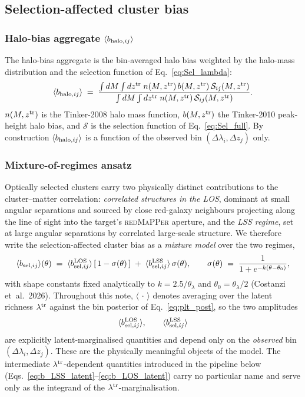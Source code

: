 \documentclass[a4paper, 11pt]{article}
\newcommand{\ltr}{\lambda^{\rm tr}}
\newcommand{\ztr}{z^{\rm tr}}
\newcommand{\bbselij}{\avg{b_{{\rm sel},ij}}}
\newcommand{\bbLOSij}{\avg{b_{{\rm sel},ij}^{\rm LOS}}}
\newcommand{\bbLSSij}{\avg{b_{{\rm sel},ij}^{\rm LSS}}}
\newcommand{\bbhaloij}{\avg{b_{{\rm halo},ij}}}
\newcommand{\avg}[1]{\langle #1 \rangle}
\begin{document}
\subsection{Selection-affected cluster bias}
\label{sec:bias}

\subsubsection{Halo-bias aggregate \texorpdfstring{$\bbhaloij$}{bhalo\_ij}}

The halo-bias aggregate is the bin-averaged halo bias weighted by the
halo-mass distribution and the selection function of
Eq.~\eqref{eq:Sel_lambda}:
\begin{equation}
\bbhaloij
 \;=\; \frac{\int dM \int d\ztr\;n(M,\ztr)\,b(M,\ztr)\,
             \mathcal{S}_{ij}(M,\ztr)}
            {\int dM \int d\ztr\;n(M,\ztr)\,
             \mathcal{S}_{ij}(M,\ztr)} .
\label{eq:bhalo}
\end{equation}
$n(M,\ztr)$ is the Tinker-2008 halo mass function, $b(M,\ztr)$ the
Tinker-2010 peak-height halo bias, and $\mathcal{S}$ is the
selection function of Eq.~\eqref{eq:Sel_full}.  By construction
$\bbhaloij$ is a function of the observed bin
$(\Delta\lambda_i,\Delta z_j)$ only.

\subsubsection{Mixture-of-regimes ansatz}

Optically selected clusters carry two physically distinct
contributions to the cluster--matter correlation: \emph{correlated
structures in the LOS}, dominant at small angular separations and
sourced by close red-galaxy neighbours projecting along the line of
sight into the target's \textsc{redMaPPer} aperture, and the
\emph{LSS regime}, set at large angular separations by correlated
large-scale structure.  We therefore write the
selection-affected cluster bias as a \emph{mixture model} over the
two regimes,
\begin{equation}
\bbselij(\theta) \;=\;
\bbLOSij\,[\,1-\sigma(\theta)\,]
\;+\;
\bbLSSij\,\sigma(\theta) ,
\qquad
\sigma(\theta) \;=\; \frac{1}{1+e^{-k(\theta-\theta_0)}} ,
\label{eq:b_sigmoid}
\end{equation}
with shape constants fixed analytically to $k=2.5/\theta_\lambda$ and
$\theta_0=\theta_\lambda/2$ (Costanzi et~al.\ 2026).  Throughout this
note, $\avg{\,\cdot\,}$ denotes averaging over the latent richness
$\ltr$ against the bin posterior of Eq.~\eqref{eq:plt_post}, so the
two amplitudes
\begin{equation}
\bbLOSij ,\qquad
\bbLSSij
\label{eq:b_regimes}
\end{equation}
are explicitly latent-marginalised quantities and depend only on the
\emph{observed} bin $(\Delta\lambda_i,\Delta z_j)$.  These are the
physically meaningful objects of the model.  The intermediate
$\ltr$-dependent quantities introduced in the pipeline below
(Eqs.~\eqref{eq:b_LSS_latent}--\eqref{eq:b_LOS_latent}) carry no
particular name and serve only as the integrand of the
$\ltr$-marginalisation.
\end{document}

